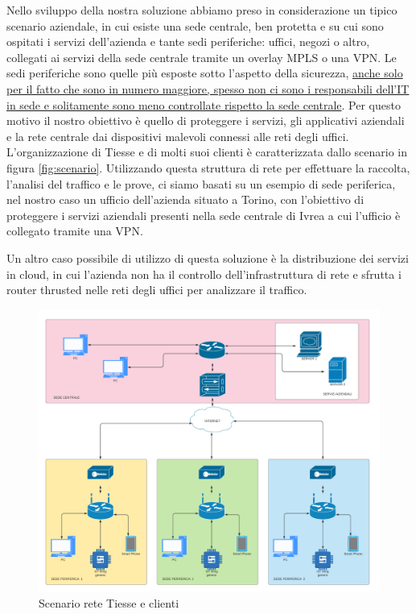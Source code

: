 Nello sviluppo della nostra soluzione abbiamo preso in considerazione un tipico scenario aziendale, in cui esiste una sede centrale, ben protetta e su cui sono ospitati i servizi dell'azienda e tante sedi periferiche: uffici, negozi o altro, collegati ai servizi della sede centrale tramite un overlay MPLS o una VPN.
Le sedi periferiche sono quelle più esposte sotto l'aspetto della sicurezza, \uline{anche solo per il fatto che sono in numero maggiore, spesso non ci sono i responsabili dell'IT in sede e solitamente sono meno controllate rispetto la sede centrale}. Per questo motivo il nostro obiettivo è quello di proteggere i servizi, gli applicativi aziendali e la rete centrale dai dispositivi malevoli connessi alle reti degli uffici.
L'organizzazione di Tiesse e di molti suoi clienti è caratterizzata dallo scenario in figura \ref{fig:scenario}. Utilizzando questa struttura di rete per effettuare la raccolta, l'analisi del traffico e le prove, ci siamo basati su un esempio di sede periferica, nel nostro caso un ufficio dell'azienda situato a Torino, con l'obiettivo di proteggere i servizi aziendali presenti nella sede centrale di Ivrea a cui l'ufficio è collegato tramite una VPN.

Un altro caso possibile di utilizzo di questa soluzione è la distribuzione dei servizi in cloud, in cui l'azienda non ha il controllo dell'infrastruttura di rete e sfrutta i router thrusted nelle reti degli uffici per analizzare il traffico.


\begin{figure}[]
    \label{fig:scenario_2}
    \includegraphics[width=\hsize]{images/introduzione/scenario.png}
    \caption{Scenario rete Tiesse e clienti}
    \centering
\end{figure}


